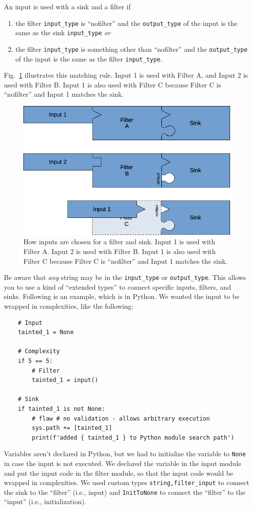 An input is used with a sink and a filter if
\begin{enumerate}[nosep]
\item the filter \verb|input_type| is ``nofilter'' and the \verb|output_type|
  of the input is the same as the sink \verb|input_type| \emph{or}
\item the filter \verb|input_type| is something other than ``nofilter'' and the
  \verb|output_type| of the input is the same as the filter \verb|input_type|.
\end{enumerate}
Fig.~\ref{fig:how inputs fit} illustrates this matching rule.  Input 1 is used with
Filter A, and Input 2 is used with Filter B.  Input 1 is also used with Filter C
because Filter C is ``nofilter'' and Input 1 matches the sink.
\begin{figure}[tbp]
  \centerline{\includegraphics[width=.667\linewidth]{fig_inputs_filters_and_sinks.png}}
  \caption{How inputs are chosen for a filter and sink.  Input 1 is used with
    Filter A.  Input 2 is used with Filter B.  Input 1 is also used with Filter C
    because Filter C is ``nofilter'' and Input 1 matches the sink.
  }
  \label{fig:how inputs fit}
\end{figure}

Be aware that \emph{any} string may be in the \verb|input_type| or
\verb|output_type|.
This allows you to use a kind of ``extended types'' to connect specific inputs,
filters, and sinks.  Following is an example, which is in Python.
We wanted the input to be wrapped in
complexities, like the following:
\begin{verbatim}
    # Input
    tainted_1 = None

    # Complexity
    if 5 == 5:
        # Filter
        tainted_1 = input()

    # Sink
    if tainted_1 is not None:
        # flaw # no validation - allows arbitrary execution
        sys.path += [tainted_1]
        print(f'added { tainted_1 } to Python module search path')
\end{verbatim}
Variables aren't declared in Python, but we had to initialize the variable to
\verb|None| in case the input is not executed.  We declared the variable in the input
module and put the input code in the filter module, so that the input code would be
wrapped in complexities.  We used custom types \verb|string,filter_input| to connect
the sink to the ``filter'' (i.e., input) and \verb|InitToNone| to connect the
``filter'' to the ``input'' (i.e., initialization).

